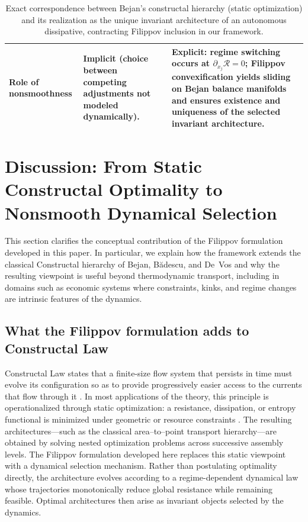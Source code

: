 \documentclass[12pt]{article}
\theoremstyle{plain}
\theoremstyle{definition}
\theoremstyle{remark}
\begin{document}
\begin{table}[H]
\begin{tabular}{p{4.1cm} p{5.9cm} p{5.9cm}}
Role of nonsmoothness
&
Implicit (choice between competing adjustments not modeled dynamically).
&
Explicit: regime switching occurs at $\partial_{x_j}\mathcal R=0$; Filippov
convexification yields sliding on Bejan balance manifolds and ensures existence
and uniqueness of the selected invariant architecture. \\
\bottomrule
\end{tabular}
\caption{Exact correspondence between Bejan’s constructal hierarchy (static optimization)
and its realization as the unique invariant architecture of an autonomous dissipative,
contracting Filippov inclusion in our framework.}
\label{tab:bejan_vs_filippov}
\end{table}





\section{Discussion: From Static Constructal Optimality to Nonsmooth Dynamical Selection}
\label{sec:discussion}

This section clarifies the conceptual contribution of the Filippov
formulation developed in this paper. In particular, we explain how the
framework extends the classical Constructal hierarchy of
Bejan, B\u{a}descu, and De~Vos
\cite{BejanBadescuDeVos2000AE}
and why the resulting viewpoint is useful beyond thermodynamic transport,
including in domains such as economic systems where constraints,
kinks, and regime changes are intrinsic features of the dynamics.

\subsection{What the Filippov formulation adds to Constructal Law}
\label{subsec:discussion_filippov_adds}

Constructal Law states that a finite-size flow system that persists in
time must evolve its configuration so as to provide progressively easier
access to the currents that flow through it
\cite{Bejan2000Book,BejanLorente2011,BejanLorente2013JAP}.
In most applications of the theory, this principle is operationalized
through static optimization: a resistance, dissipation, or entropy
functional is minimized under geometric or resource constraints
\cite{BejanTsatsaronisMoran1996,Rocha2006IJHMT,Soni2020ProcRSocA}.
The resulting architectures—such as the classical area--to--point
transport hierarchy—are obtained by solving nested optimization
problems across successive assembly levels. The Filippov formulation developed here replaces this static viewpoint
with a dynamical selection mechanism.
Rather than postulating optimality directly, the architecture evolves
according to a regime-dependent dynamical law whose trajectories
monotonically reduce global resistance while remaining feasible.
Optimal architectures then arise as invariant objects selected by the
dynamics.
\end{document}
